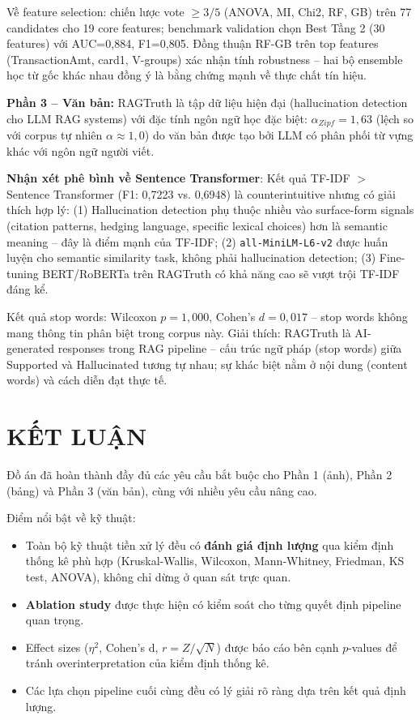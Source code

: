 \documentclass[12pt,a4paper]{article}
\let\oldtextbf\textbf
\renewcommand{\textbf}[1]{\oldtextbf{\textcolor{hcmublue}{#1}}}
\begin{document}
Về feature selection: chiến lược vote $\geq 3/5$ (ANOVA, MI, Chi2, RF, GB) trên 77 candidates cho 19 core features; benchmark validation chọn Best Tầng 2 (30 features) với AUC=0{,}884, F1=0{,}805. Đồng thuận RF-GB trên top features (TransactionAmt, card1, V-groups) xác nhận tính robustness -- hai bộ ensemble học từ gốc khác nhau đồng ý là bằng chứng mạnh về thực chất tín hiệu.

\textbf{Phần 3 -- Văn bản:}
RAGTruth là tập dữ liệu hiện đại (hallucination detection cho LLM RAG systems) với đặc tính ngôn ngữ học đặc biệt: $\alpha_{Zipf} = 1{,}63$ (lệch so với corpus tự nhiên $\alpha \approx 1{,}0$) do văn bản được tạo bởi LLM có phân phối từ vựng khác với ngôn ngữ người viết.

\textbf{Nhận xét phê bình về Sentence Transformer}: Kết quả TF-IDF $>$ Sentence Transformer (F1: 0{,}7223 vs. 0{,}6948) là counterintuitive nhưng có giải thích hợp lý: (1) Hallucination detection phụ thuộc nhiều vào surface-form signals (citation patterns, hedging language, specific lexical choices) hơn là semantic meaning -- đây là điểm mạnh của TF-IDF; (2) \texttt{all-MiniLM-L6-v2} được huấn luyện cho semantic similarity task, không phải hallucination detection; (3) Fine-tuning BERT/RoBERTa trên RAGTruth có khả năng cao sẽ vượt trội TF-IDF đáng kể.

Kết quả stop words: Wilcoxon $p = 1{,}000$, Cohen's $d = 0{,}017$ -- stop words không mang thông tin phân biệt trong corpus này. Giải thích: RAGTruth là AI-generated responses trong RAG pipeline -- cấu trúc ngữ pháp (stop words) giữa Supported và Hallucinated tương tự nhau; sự khác biệt nằm ở nội dung (content words) và cách diễn đạt thực tế.

\section{KẾT LUẬN}

Đồ án đã hoàn thành đầy đủ các yêu cầu bắt buộc cho Phần 1 (ảnh), Phần 2 (bảng) và Phần 3 (văn bản), cùng với nhiều yêu cầu nâng cao.

Điểm nổi bật về kỹ thuật:
\begin{itemize}
    \item Toàn bộ kỹ thuật tiền xử lý đều có \textbf{đánh giá định lượng} qua kiểm định thống kê phù hợp (Kruskal-Wallis, Wilcoxon, Mann-Whitney, Friedman, KS test, ANOVA), không chỉ dừng ở quan sát trực quan.
    \item \textbf{Ablation study} được thực hiện có kiểm soát cho từng quyết định pipeline quan trọng.
    \item Effect sizes ($\eta^2$, Cohen's d, $r = Z/\sqrt{N}$) được báo cáo bên cạnh $p$-values để tránh overinterpretation của kiểm định thống kê.
    \item Các lựa chọn pipeline cuối cùng đều có lý giải rõ ràng dựa trên kết quả định lượng.
\end{itemize}
\end{document}
